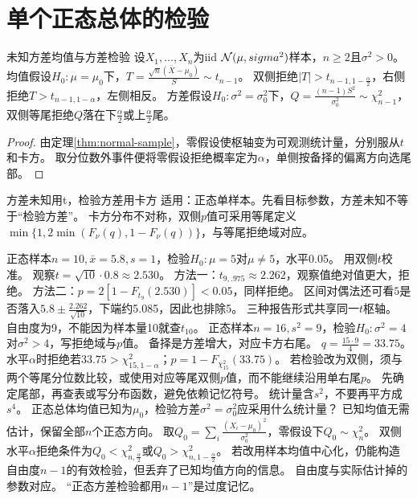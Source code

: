 \section{单个正态总体的检验}\label{sec:82}
\begin{theorem}{未知方差均值与方差检验}
设$X_1,\ldots,X_n$为iid $\mathcal N(\mu,sigma^2)$样本，$n\ge2$且$\sigma^2>0$。均值假设$H_0:\mu=\mu_0$下，$T=\frac{\sqrt n(\bar X-\mu_0)}{S}\sim t_{n-1}$。
双侧拒绝$|T|>t_{n-1,1-\frac{\alpha}{2}}$，右侧拒绝$T>t_{n-1,1-\alpha}$，左侧相反。
方差假设$H_0:\sigma^2=\sigma_0^2$下，$Q=\frac{(n-1)S^2}{\sigma_0^2}\sim\chi_{n-1}^2$，双侧等尾拒绝$Q$落在下$\frac{\alpha}{2}$或上$\frac{\alpha}{2}$尾。
\end{theorem}
\begin{proof}
由定理\ref{thm:normal-sample}，零假设使枢轴变为可观测统计量，分别服从$t$和卡方。
取分位数外事件便将零假设拒绝概率定为$\alpha$，单侧按备择的偏离方向选尾部。
\end{proof}
\begin{method}{方差未知用t，检验方差用卡方}
适用：正态单样本。先看目标参数，方差未知不等于“检验方差”。
卡方分布不对称，双侧$p$值可采用等尾定义$\min\{1,2\min(F_\nu(q),1-F_\nu(q))\}$，与等尾拒绝域对应。
\end{method}
{正态样本$n=10,\bar x=5.8,s=1$，检验$H_0:\mu=5$对$\mu\ne5$，水平0.05。}
{用双侧$t$校准。}
{观察$t=\sqrt{10}\cdot0.8\approx2.530$。
方法一：$t_{9,.975}\approx2.262$，观察值绝对值更大，拒绝。
方法二：$p=2[1-F_{t_9}(2.530)]<0.05$，同样拒绝。
区间对偶法还可看$5$是否落入$5.8\pm\frac{2.262}{\sqrt{10}}$，下端约5.085，因此也排除5。}
{三种报告形式共享同一$t$枢轴。}
{自由度为9，不能因为样本量10就查$t_{10}$。}
{正态样本$n=16,s^2=9$，检验$H_0:\sigma^2=4$对$\sigma^2>4$，写拒绝域与$p$值。}
{备择是方差增大，对应卡方右尾。}
{$q=\frac{15\cdot9}{4}=33.75$。
水平$\alpha$时拒绝若$33.75>\chi^2_{15,1-\alpha}$；$p=1-F_{\chi^2_{15}}(33.75)$。
若检验改为双侧，须与两个等尾分位数比较，或使用对应等尾双侧$p$值，而不能继续沿用单右尾$p$。}
{先确定尾部，再查表或写分布函数，避免依赖记忆符号。}
{统计量含$s^2$，不要再平方成$s^4$。}
{正态总体均值已知为$\mu_0$，检验方差$\sigma^2=\sigma_0^2$应采用什么统计量？}
{已知均值无需估计，保留全部$n$个正态方向。}
{取$Q_0=\sum_i\frac{(X_i-\mu_0)^2}{\sigma_0^2}$，零假设下$Q_0\sim\chi_n^2$。
双侧水平$\alpha$拒绝条件为$Q_0<\chi^2_{n,\frac{\alpha}{2}}$或$Q_0>\chi^2_{n,1-\frac{\alpha}{2}}$。
若改用样本均值中心化，仍能构造自由度$n-1$的有效检验，但丢弃了已知均值方向的信息。}
{自由度与实际估计掉的参数对应。}
{“正态方差检验都用$n-1$”是过度记忆。}

